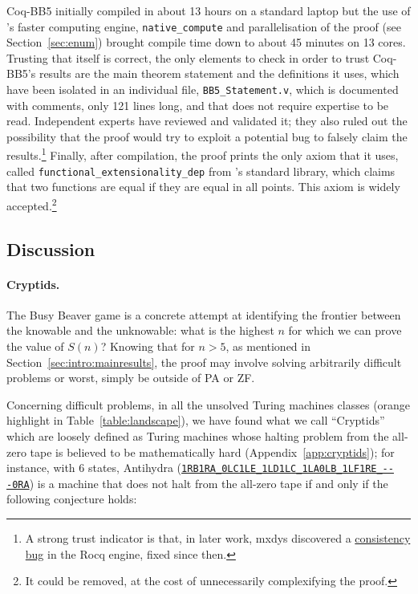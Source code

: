 \documentclass[a4paper,british]{article}
\theoremstyle{definition} %
\numberwithin{equation}{section}
\theoremstyle{definition} %
\newcommand{\tm}[1]{\href{https://bbchallenge.org/#1}{\texttt{\nolinkurl{#1}}}}
\newcommand{\CoqBB}{Coq-BB5\xspace}
\begin{document}
\CoqBB initially compiled in about 13 hours on a standard laptop but the use of \Coq's faster computing engine, \texttt{native\_compute} \cite{nativecompute} and parallelisation of the proof (see Section~\ref{sec:enum}) brought compile time down to about 45 minutes on 13 cores. Trusting that \Coq itself is correct, the only elements to check in order to trust \CoqBB's results are the main theorem statement and the definitions it uses, which have been isolated in an individual file, \texttt{BB5\_Statement.v}, which is documented with comments, only 121 lines long, and that does not require \Coq expertise to be read. Independent \Coq experts have reviewed and validated it; they also ruled out the possibility that the proof would try to exploit a potential \Coq bug to falsely claim the results.\footnote{A strong trust indicator is that, in later work, mxdys discovered a \href{https://github.com/rocq-prover/rocq/issues/20413}{consistency bug} in the Rocq engine, fixed since then.} Finally, after compilation, the proof prints the only axiom that it uses, called \texttt{functional\_extensionality\_dep} from \Coq's standard library, which claims that two functions are equal if they are equal in all points. This axiom is widely accepted.\footnote{It could be removed, at the cost of unnecessarily complexifying the proof.}

\vspace{-1em}
\subsection{Discussion}\label{sec:intro:discuss}

\paragraph{Cryptids.} The Busy Beaver game is a concrete attempt at identifying the frontier between the knowable and the unknowable: what is the highest $n$ for which we can prove the value of $S(n)$? Knowing that for $n > 5$, as mentioned in Section~\ref{sec:intro:mainresults}, the proof may involve solving arbitrarily difficult problems or worst, simply be outside of PA or ZF.


Concerning difficult problems, in all the unsolved Turing machines classes (orange highlight in Table~\ref{table:landscape}), we have found what we call ``Cryptids'' which are loosely defined as Turing machines whose halting problem from the all-zero tape is believed to be mathematically hard (Appendix~\ref{app:cryptids}); for instance, with 6 states, Antihydra (\tm{1RB1RA_0LC1LE_1LD1LC_1LA0LB_1LF1RE_---0RA}) is a machine that does not halt from the all-zero tape if and only if the following conjecture holds:
\end{document}

